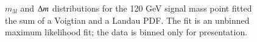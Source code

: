 \begin{figure}[H!]
\begin{minipage}[c]{\textwidth}
  \centering
  \caption{$m_{3l}$ and $\Delta m$ distributions for the 120 GeV signal mass point fitted the sum of a Voigtian and a Landau PDF. The fit is an unbinned maximum likelihood fit; the data is binned only for presentation.}
  \label{fig:SigFit}
 \subfloat[$m_{3l}$ ] {
}
\end{minipage}
\end{figure}
